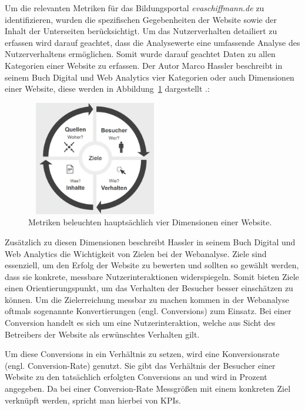 Um die relevanten Metriken für das Bildungsportal \textit{evaschiffmann.de} zu identifizieren, wurden die spezifischen Gegebenheiten der Website sowie der Inhalt der Unterseiten berücksichtigt. Um das Nutzerverhalten detailiert zu erfassen wird darauf geachtet, dass die Analysewerte eine umfassende Analyse des Nutzerverhaltens ermöglichen. Somit wurde darauf geachtet Daten zu allen Kategorien einer Website zu erfassen. Der Autor Marco Hassler beschreibt in seinem Buch \glqq Digital und Web Analytics\grqq{} vier Kategorien oder auch Dimensionen einer Website, diese werden in Abbildung~\ref{fig:dimensionen} dargestellt \parencite[Kap.5.7]{Hassler2019}.: 

\begin{figure}[H]
    \centering
    \includegraphics[width=6cm, height=5cm, keepaspectratio]{images/dimensionen.png}
    \caption{Metriken beleuchten hauptsächlich vier Dimensionen einer Website. \parencite[Kap.5.7]{Hassler2019}}%
    \label{fig:dimensionen}%
\end{figure}

Zusätzlich zu diesen Dimensionen beschreibt Hassler in seinem Buch \glqq Digital und Web Analytics\grqq{} die Wichtigkeit von Zielen bei der Webanalyse. Ziele sind essenziell, um den Erfolg der Website zu bewerten und sollten so gewählt werden, dass sie konkrete, messbare Nutzerinteraktionen widerspiegeln. Somit bieten Ziele einen Orientierungspunkt, um das Verhalten der Besucher besser einschätzen zu können. Um die Zielerreichung messbar zu machen kommen in der Webanalyse oftmals sogenannte Konvertierungen (engl. Conversions) zum Einsatz. Bei einer Conversion handelt es sich um eine Nutzerinteraktion, welche aus Sicht des Betreibers der Website als erwünschtes Verhalten gilt. \parencite[Kap.13]{Hassler2019}

Um diese Conversions in ein Verhältnis zu setzen, wird eine Konversionsrate (engl. Conversion-Rate) genutzt. Sie gibt das Verhältnis der Besucher einer Website zu den tatsächlich erfolgten Conversions an und wird in Prozent angegeben. Da bei einer Conversion-Rate Messgrößen mit einem konkreten Ziel verknüpft werden, spricht man hierbei von KPIs. \parencite{RyteConversion}

